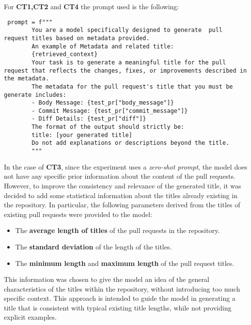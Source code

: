 For \textbf{CT1,CT2} and \textbf{CT4} the prompt used is the following:
\begin{verbatim}
 prompt = f"""
        You are a model specifically designed to generate  pull request titles based on metadata provided. 
        An example of Metadata and related title:
        {retrieved_context}
        Your task is to generate a meaningful title for the pull request that reflects the changes, fixes, or improvements described in the metadata. 
        The metadata for the pull request's title that you must be generate includes:
        - Body Message: {test_pr["body_message"]}
        - Commit Message: {test_pr["commit_message"]}
        - Diff Details: {test_pr["diff"]}
        The format of the output should strictly be:
        title: [your generated title]
        Do not add explanations or descriptions beyond the title.
        """
\end{verbatim}
In the case of \textbf{CT3}, since the experiment uses a \textit{zero-shot prompt}, the model does not have any specific prior information about the content of the pull requests. However, to improve the consistency and relevance of the generated title, it was decided to add some statistical information about the titles already existing in the repository. In particular, the following parameters derived from the titles of existing pull requests were provided to the model:

\begin{itemize}
\item The \textbf{average length of titles} of the pull requests in the repository.
\item The \textbf{standard deviation} of the length of the titles.
\item The \textbf{minimum length} and \textbf{maximum length} of the pull request titles.
\end{itemize}

This information was chosen to give the model an idea of the general characteristics of the titles within the repository, without introducing too much specific context. This approach is intended to guide the model in generating a title that is consistent with typical existing title lengths, while not providing explicit examples.

